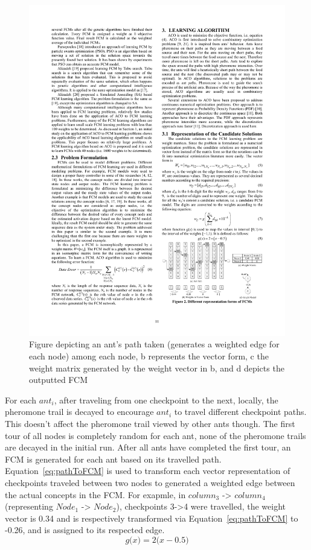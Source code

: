 \documentclass{umm-senior-sem}
\begin{document}
\begin{figure}
\label{fig:antPath}
\includegraphics[scale=1]{images/antPath.pdf}
\caption{Figure depicting an ant's path taken (generates a weighted edge for each node) among each node, b represents the vector form, c the weight matrix generated by the weight vector in b, and d depicts the outputted FCM}
\end{figure}
For each $ant_i$, after traveling from one checkpoint to the next, locally, the pheromone trail is decayed to encourage $ant_i$ to travel different checkpoint paths. This doesn't affect the pheromone trail viewed by other ants though. The first tour of all nodes is completely random for each ant, none of the pheromone trails are decayed in the initial run. After all ants have completed the first tour, an FCM is generated for each ant based on its travelled path. Equation~\ref{eq:pathToFCM} is used to transform each vector representation of checkpoints traveled between two nodes to generated a weighted edge between the actual concepts in the FCM. For exapmle,  in $column_3$ -> $column_4$ (representing $Node_1$ -> $Node_2$), checkpoints 3->4 were travelled, the weight vector is 0.34 and is respectively transformed via Equation~\ref{eq:pathToFCM} to -0.26,  and is assigned to its respected edge.
\begin{equation}
\label{eq:pathToFCM}
g\big(x\big) = 2 \big(x-0.5\big) 
\end{equation}
\end{document}
